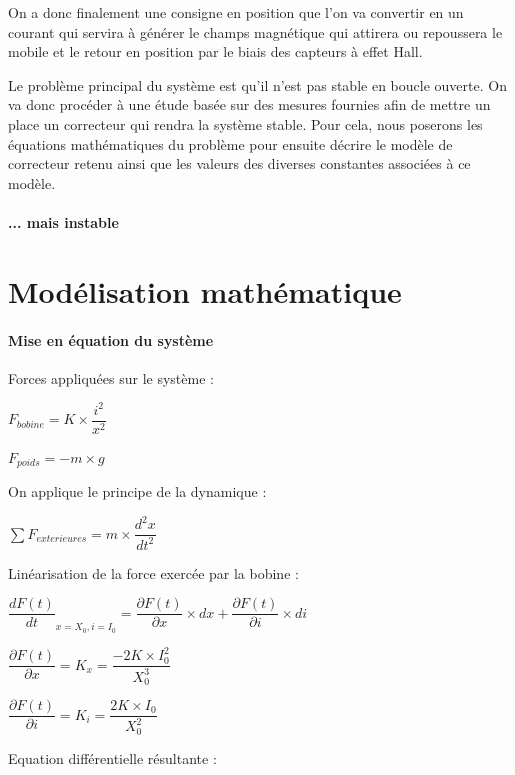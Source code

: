 \documentclass[11pt, french]{article} %
\begin{document}
On a donc finalement une consigne en position que l'on va convertir en un courant qui servira à générer le champs magnétique qui attirera ou repoussera le mobile et le retour en position par le biais des capteurs à effet Hall. 

Le problème principal du système est qu'il n'est pas stable en boucle ouverte. On va donc procéder à une étude basée sur des mesures fournies afin de mettre un place un correcteur qui rendra la système stable. Pour cela, nous poserons les équations mathématiques du problème pour ensuite décrire le modèle de correcteur retenu ainsi que les valeurs des diverses constantes associées à ce modèle.

\paragraph{... mais instable}

\section{Modélisation mathématique}

\paragraph{Mise en équation du système}

Forces appliquées sur le système :
\newline

$ F_{bobine} = K \times \dfrac{i^2}{x^2}  $

$ F_{poids} = -m \times g $

On applique le principe de la dynamique :
\newline

$ \sum F_{exterieures}  = m \times {\dfrac{{d^2}x}{dt^2}} $

Linéarisation de la force exercée par la bobine :
\newline

$ {\dfrac{dF(t)}{dt}}_{x = X_0, i = I_0} = \dfrac{\partial F(t)}{\partial x} \times dx + \dfrac{\partial F(t)}{\partial i} \times di $

$ \dfrac{\partial F(t)}{\partial x} = K_x = \dfrac{-2K \times I_0^2}{X_0^3} $

$ \dfrac{\partial F(t)}{\partial i} = K_i = \dfrac{2K \times I_0}{X_0^2} $

Equation différentielle résultante :
\newline
\end{document}
